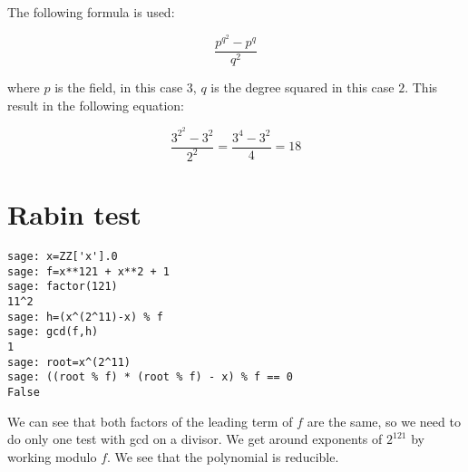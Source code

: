 \documentclass{article}
\begin{document}
The following formula is used:

\[
\frac{p^{q^2} - p^q}{q^2}
\]

where $p$ is the field, in this case $3$, $q$ is the degree squared in this case $2$.
This result in the following equation:

\[
\frac{3^{2^2} - 3^2}{2^2} = \frac{3^4 - 3^2}{4} = 18
\]

\section{Rabin test}
\begin{verbatim}
sage: x=ZZ['x'].0
sage: f=x**121 + x**2 + 1
sage: factor(121)
11^2
sage: h=(x^(2^11)-x) % f
sage: gcd(f,h)
1
sage: root=x^(2^11)
sage: ((root % f) * (root % f) - x) % f == 0
False
\end{verbatim}
We can see that both factors of the leading term of $f$ are the same, so we need to do only one test with gcd on a divisor.
We get around exponents of $2^{121}$ by working modulo $f$.
We see that the polynomial is reducible.
\end{document}

